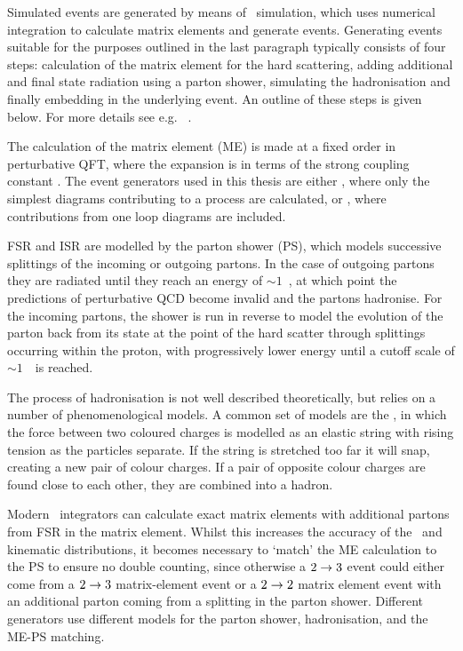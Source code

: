 Simulated events are generated by
means of \mc\ simulation, which uses numerical integration to calculate matrix
elements and generate events. Generating events suitable for the purposes
outlined in the last paragraph typically consists of four steps:
calculation of the matrix element for the hard scattering, adding additional and
final state radiation using a parton shower,
simulating the hadronisation and finally embedding in the underlying event. An
outline of these steps is given below. For more details see e.g.
~\cite{Sjostrand:2006su,Campbell:2006wx}.

The calculation of the matrix element (ME) is
made at a fixed order in perturbative QFT, where the expansion is in terms of
the strong coupling constant \alphaS. The event generators used in this thesis
are either , where only the simplest diagrams
contributing to a process are calculated, or ,
where contributions from one loop diagrams are included. 

FSR and ISR are
modelled by the parton shower (PS), which models successive splittings of the
incoming or outgoing partons. In the case of outgoing partons they are radiated
until they reach an energy of $\sim1$~\gev, at
which point the predictions of perturbative QCD become invalid and the partons
hadronise. For the incoming partons, the
shower is run in reverse to model the evolution of the parton back from its state
at the point of the hard scatter through splittings occurring within the proton,
with progressively lower energy until a cutoff scale of $\sim1$~\gev\ is reached.

The process of hadronisation is not well described theoretically,
but relies on a number of phenomenological models. A common set of models are
the , in which the
force between two coloured charges is modelled as an elastic string with
rising tension as the particles separate. If the string is stretched too far
it will snap, creating a new pair of colour charges. If a pair of opposite
colour charges are found close to each other, they are combined into a hadron.

Modern \mc\ integrators can calculate exact matrix elements with additional
partons from FSR in the matrix element. Whilst this increases the accuracy of
the \cx\ and kinematic distributions, it becomes necessary to `match' the
ME calculation to the PS to ensure no double counting, since otherwise a
$2\rightarrow3$ event could either come from a $2\rightarrow3$ matrix-element event or a $2\rightarrow2$
matrix element event with an additional parton coming from a splitting in the
parton shower. Different generators use different models for the parton
shower, hadronisation, and the ME-PS matching.

